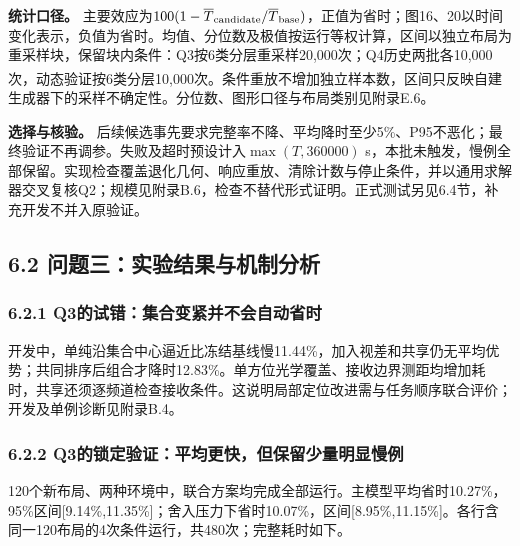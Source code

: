 \documentclass[UTF8,fontset=none,zihao=-4,a4paper]{ctexart}
\begin{document}
\textbf{统计口径。} 主要效应为\(100(1-\overline T_{\rm candidate}/\overline T_{\rm base})\)，正值为省时；图16、20以时间变化表示，负值为省时。均值、分位数及极值按运行等权计算，区间以独立布局为重采样块，保留块内条件：Q3按6类分层重采样20,000次；Q4历史两批各10,000次，动态验证按6类分层10,000次\textsuperscript{\cite{efron1979}}。条件重放不增加独立样本数，区间只反映自建生成器下的采样不确定性。分位数、图形口径与布局类别见附录E.6。

\textbf{选择与核验。} 后续候选事先要求完整率不降、平均降时至少5\%、P95不恶化；最终验证不再调参。失败及超时预设计入\(\max(T,360000)\) s，本批未触发，慢例全部保留。实现检查覆盖退化几何、响应重放、清除计数与停止条件，并以通用求解器交叉复核Q2；规模见附录B.6，检查不替代形式证明。正式测试另见6.4节，补充开发不并入原验证。

\FloatBarrier
\subsection{6.2 问题三：实验结果与机制分析}\label{ux95eeux9898ux4e09ux5b9eux9a8cux7ed3ux679cux4e0eux673aux5236ux5206ux6790}

\subsubsection{6.2.1 Q3的试错：集合变紧并不会自动省时}\label{q3ux7684ux8bd5ux9519ux96c6ux5408ux53d8ux7d27ux5e76ux4e0dux4f1aux81eaux52a8ux7701ux65f6}

开发中，单纯沿集合中心逼近比冻结基线慢11.44\%，加入视差和共享仍无平均优势；共同排序后组合才降时12.83\%。单方位光学覆盖、接收边界测距均增加耗时，共享还须逐频道检查接收条件。这说明局部定位改进需与任务顺序联合评价；开发及单例诊断见附录B.4。

\subsubsection{6.2.2 Q3的锁定验证：平均更快，但保留少量明显慢例}\label{q3ux7684ux9501ux5b9aux9a8cux8bc1ux5e73ux5747ux66f4ux5febux4f46ux4fddux7559ux5c11ux91cfux660eux663eux6162ux4f8b}

120个新布局、两种环境中，联合方案均完成全部运行。主模型平均省时10.27\%，95\%区间{[}9.14\%,11.35\%{]}；舍入压力下省时10.07\%，区间{[}8.95\%,11.15\%{]}。各行含同一120布局的4次条件运行，共480次；完整耗时如下。
\end{document}
